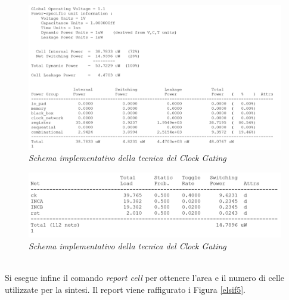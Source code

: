 \begin{figure}[!htb]
	\centering
	\includegraphics[scale=0.65]{immagini/elsif1}
	\caption{\textit{Schema implementativo della tecnica del Clock Gating}}
	\label{elsif3}
\end{figure}
\begin{figure}[!htb]
	\centering
	\includegraphics[scale=0.65]{immagini/elsif2}
	\caption{\textit{Schema implementativo della tecnica del Clock Gating}}
	\label{elsif4}
\end{figure}
\\
Si esegue infine il comando \textit{report cell} per ottenere l'area e il numero di celle utilizzate per la sintesi. Il report viene raffigurato i Figura \ref{elsif5}. \\
\newpage
